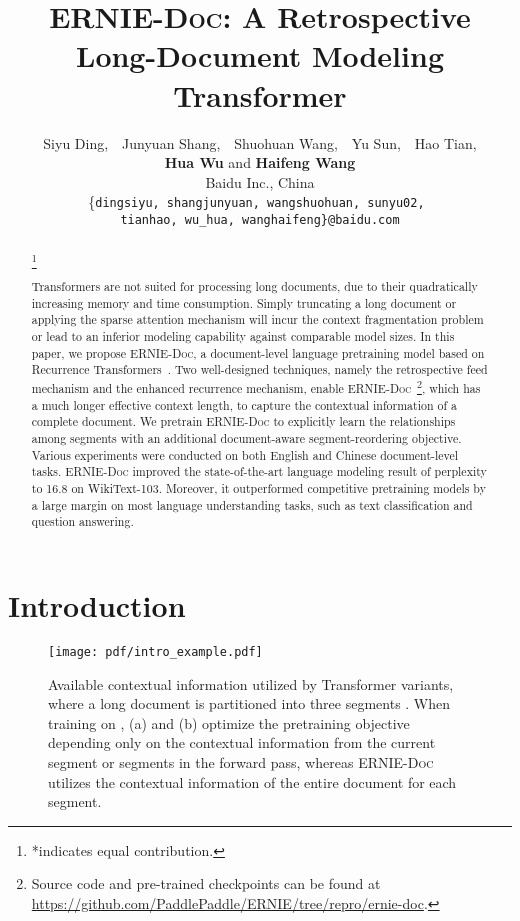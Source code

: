 \documentclass[11pt,a4paper]{article}
\author{
    Siyu Ding,~~Junyuan Shang,~~Shuohuan Wang,~~Yu Sun,~~Hao Tian, \\ 
    \textbf{Hua Wu} and \textbf{Haifeng Wang} \\
    Baidu Inc., China\\
    \{\texttt{dingsiyu, shangjunyuan, wangshuohuan, sunyu02, } \\
    \texttt{tianhao, wu\_hua, wanghaifeng\}@baidu.com}
}
\title{\textsc{ERNIE-Doc}: A Retrospective Long-Document Modeling Transformer}
\date{}
\newcommand{\mname}{\textsc{ERNIE-Doc}\xspace}
\newcommand\blfootnote[1]{\begingroup
\renewcommand\thefootnote{}\footnote{#1}\addtocounter{footnote}{-1}\endgroup
}
\begin{document}
\maketitle
\begin{abstract}
\blfootnote{*indicates equal contribution.}
Transformers are not suited for processing long documents, due to their quadratically increasing memory and time consumption. Simply truncating a long document or applying the sparse attention mechanism will incur the context fragmentation problem or lead to an inferior modeling capability against comparable model sizes. In this paper, we propose \mname, a document-level language pretraining model based on Recurrence Transformers~\citep{transformer_xl}. Two well-designed techniques, namely the retrospective feed mechanism and the enhanced recurrence mechanism, enable \mname~\footnote{Source code and pre-trained checkpoints can be found at \url{https://github.com/PaddlePaddle/ERNIE/tree/repro/ernie-doc}.}, which has a much longer effective context length, to capture the contextual information of a complete document. We pretrain \mname to explicitly learn the relationships among segments with an additional document-aware segment-reordering objective. Various experiments were conducted on both English and Chinese document-level tasks. \mname 
improved the state-of-the-art language modeling result of perplexity to 16.8 on WikiText-103. Moreover, it outperformed competitive pretraining models by a large margin on most language understanding tasks, such as text classification and question answering.
\end{abstract}


\section{Introduction}

\begin{figure}[!t]
\centering
\texttt{[image: pdf/intro\_example.pdf]}
\caption{Available contextual information utilized by Transformer variants, where a long document  is partitioned into three segments . When training on , (a) and (b) optimize the pretraining objective depending only on the contextual information from the current segment or segments in the forward pass, whereas \mname utilizes the contextual information of the entire document for each segment.}
\label{fig:intro-example}
\vspace{-0.5cm}
\end{figure}
\end{document}
